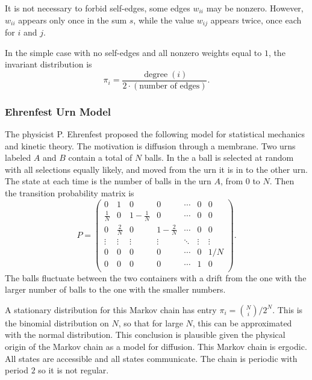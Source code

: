 \documentclass[12pt]{article}
\begin{document}
It is not necessary to forbid self-edges, some edges $w_{ii}$ may be
nonzero.  However, $w_{ii}$ appears only once in the sum $s$, while
the value $w_{ij}$ appears twice, once each for $i$ and $j$.

In the simple case with no self-edges and all nonzero weights equal
to $1$, the invariant distribution is
\[
  \pi_i = \frac{\operatorname{degree}(i)}{2 \cdot (\text{number of
      edges})}.
\]


\subsubsection*{Ehrenfest Urn Model}

The physicist P. Ehrenfest proposed the following model for statistical
mechanics and kinetic theory.  The motivation is diffusion through a
membrane.  Two urns labeled \( A \) and \( B \) contain a total of \( N \)
balls.  In the  a%
ball is selected at random with all selections equally likely, and moved
from the urn it is in to the other urn.  The state at each time is the
number of balls in the urn \( A \), from \( 0 \) to \( N \).  Then the
transition probability matrix is
\[
    P =
    \begin{pmatrix}
        0 & 1 & 0 & 0 & \cdots & 0 & 0 \\
        \frac{1}{N} & 0 & 1-\frac{1}{N} & 0 & \cdots & 0 & 0 \\
        0 & \frac{2}{N} & 0 & 1-\frac{2}{N} & \cdots & 0 & 0 \\
        \vdots & \vdots & \vdots & \vdots & \ddots& \vdots & \vdots \\
        0 & 0 & 0 & 0 & \cdots & 0 & 1/N \\
        0 & 0 & 0 & 0 & \cdots & 1 & 0 \\
    \end{pmatrix}
    .
\] The balls fluctuate between the two containers with a drift from the
one with the larger number of balls to the one with the smaller numbers.

A stationary distribution for this Markov chain has entry \( \pi_i =
\binom{N}{i}/2^N \).   This is the binomial distribution on \( N \),
so that for large \( N \), this can be approximated with the normal
distribution.  This conclusion is plausible given the physical origin of
the Markov chain as a model for diffusion. This Markov chain is
ergodic.  All states are accessible and all states communicate.  The
chain is periodic with period \( 2 \) so it is not regular.
\end{document}
